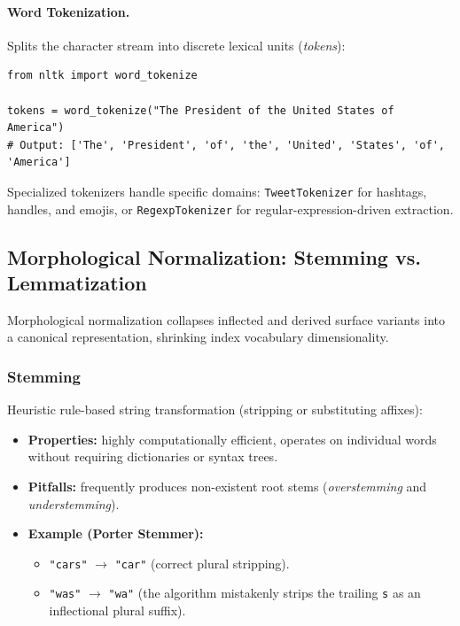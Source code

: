 \paragraph{Word Tokenization.}
Splits the character stream into discrete lexical units (\textit{tokens}):
\begin{lstlisting}[style=pythoncode,caption={Standard word tokenization with NLTK.}]
from nltk import word_tokenize

tokens = word_tokenize("The President of the United States of America")
# Output: ['The', 'President', 'of', 'the', 'United', 'States', 'of', 'America']
\end{lstlisting}
Specialized tokenizers handle specific domains: \texttt{TweetTokenizer} for hashtags, handles, and emojis, or \texttt{RegexpTokenizer} for regular-expression-driven extraction.

\subsection[Morphological Normalization: Stemming vs. Lemmatization]{Morphological Normalization: Stemming vs.\\ Lemmatization}
\label{sec:stemming-lemmatizzazione-en}

Morphological normalization collapses inflected and derived surface variants into a canonical representation, shrinking index vocabulary dimensionality.

\subsubsection{Stemming}
Heuristic rule-based string transformation (stripping or substituting affixes):
\begin{itemize}
    \item \textbf{Properties:} highly computationally efficient, operates on individual words without requiring dictionaries or syntax trees.
    \item \textbf{Pitfalls:} frequently produces non-existent root stems (\textit{overstemming} and \textit{understemming}).
    \item \textbf{Example (Porter Stemmer):}
    \begin{itemize}
        \item \texttt{"cars"} $\to$ \texttt{"car"} (correct plural stripping).
        \item \texttt{"was"} $\to$ \texttt{"wa"} (the algorithm mistakenly strips the trailing \texttt{s} as an inflectional plural suffix).
    \end{itemize}
\end{itemize}

